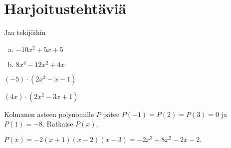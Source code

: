 \begin{lukusuora}{-4}{4}{3}
\end{lukusuora}
\begin{lukusuora}{-2.8}{2.8}{3}
\end{lukusuora}

\section{Harjoitustehtäviä}

\begin{tehtava}
  Jaa tekijöihin
  \begin{enumerate}[a)]
    \item $-10x^2+5x+5$
    \item $8x^4-12x^2+4x$
  \end{enumerate}

  \begin{vastaus}
    \item $(-5)\cdot(2x^2-x-1)$
    \item $(4x)\cdot(2x^2-3x+1)$
  \end{vastaus}
\end{tehtava}

\begin{tehtava}
  Kolmanen asteen polynomille $P$ pätee $P(-1)=P(2)=P(3)=0$ ja $P(1)=-8$. Ratkaise $P(x)$.

  \begin{vastaus}
    $P(x)=-2(x+1)(x-2)(x-3)=-2x^3+8x^2-2x-2.$
  \end{vastaus}
\end{tehtava}

